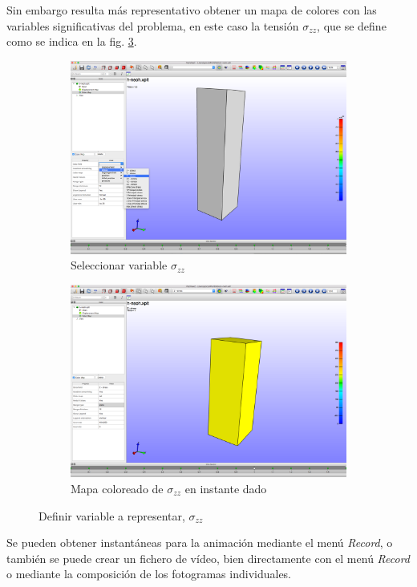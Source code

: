 Sin embargo resulta más representativo obtener un mapa de colores con las variables significativas del problema, en este caso la tensión $\sigma_{zz}$, que se define como se indica en la fig. \ref{fig:post-04-05}.
\begin{figure}[!htp]
\centering
\begin{subfigure}[b]{0.48\textwidth}
\centering
\includegraphics[width=\textwidth]{figuras_3/scr-post-04.png}
\caption{Seleccionar variable $\sigma_{zz}$}
\label{fig:post-04}
\end{subfigure}
\begin{subfigure}[b]{0.48\textwidth}
\centering
\includegraphics[width=\textwidth]{figuras_3/scr-post-05.png}
\caption{Mapa coloreado de $\sigma_{zz}$ en instante dado}
\label{fig:post-05}
\end{subfigure}
\caption{Definir variable a representar, $\sigma_{zz}$}
\label{fig:post-04-05}
\end{figure}
Se pueden obtener instantáneas para la animación mediante el menú \emph{Record}, o también se puede crear un fichero de vídeo, bien directamente con el menú \emph{Record} o mediante la composición de los fotogramas individuales.

